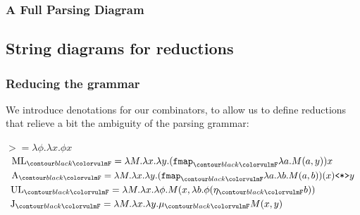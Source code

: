 \documentclass[math, english, info]{beamercours}
\begin{document}
\begin{frame}
	\frametitle{A Full Parsing Diagram}
	\vspace{-.25cm}
	\centering
\end{frame}

\subsection{String diagrams for reductions}
\begin{frame}
	\frametitle{Reducing the grammar}
	We introduce denotations for our combinators, to allow us to define
	reductions that relieve a bit the ambiguity of the parsing grammar:
	\begin{center}
		$	>                    = \lambda \phi. \lambda x. \phi x $\\[1.5ex]
		$ \combML_{\f{F}}      = \lambda M. \lambda x. \lambda y. (\fmap_{\f{F}} \lambda a. M(a, y)) x $\\[1.5ex]
		$	\combA_{\f{F}}       = \lambda M. \lambda x. \lambda y. (\fmap_{\f{F}}\lambda a. \lambda b. M(a, b))(x) \texttt{<*>} y $\\[1.5ex]
		$	\combUL_{\f{F}}      = \lambda M. \lambda x. \lambda \phi. M(x, \lambda b. \phi(\eta_{\f{F}} b))$\\[1.5ex]
		$ \combJ_{\f{F}}       = \lambda M. \lambda x. \lambda y. \mu_{\f{F}} M(x, y) $\\[1.5ex]
	\end{center}
\end{frame}
\end{document}

